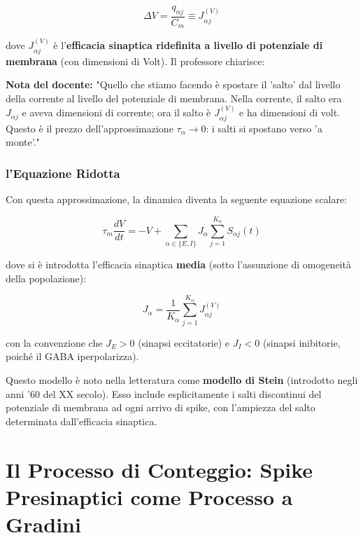 \begin{equation}
\Delta V = \frac{q_{\alpha j}}{C_m} \equiv J_{\alpha j}^{(V)}
\end{equation}

dove $J_{\alpha j}^{(V)}$ è l'\textbf{efficacia sinaptica ridefinita a livello di potenziale di membrana} (con dimensioni di Volt). Il professore chiarisce:

\begin{tcolorbox}[colback=gray!5, colframe=gray!40, arc=2mm, boxrule=0.5pt]
\textbf{Nota del docente:} "Quello che stiamo facendo è spostare il 'salto' dal livello della corrente al livello del potenziale di membrana. Nella corrente, il salto era $J_{\alpha j}$ e aveva dimensioni di corrente; ora il salto è $J_{\alpha j}^{(V)}$ e ha dimensioni di volt. Questo è il prezzo dell'approssimazione $\tau_\alpha \to 0$: i salti si spostano verso 'a monte'."
\end{tcolorbox}

\subsubsection{ l'Equazione Ridotta}

Con questa approssimazione, la dinamica diventa la seguente equazione scalare:

\begin{equation}
\tau_m \frac{dV}{dt} = -V + \sum_{\alpha \in \{E,I\}} J_\alpha \sum_{j=1}^{K_\alpha} S_{\alpha j}(t)
\end{equation}

dove si è introdotta l'efficacia sinaptica \textbf{media} (sotto l'assunzione di omogeneità della popolazione):

\begin{equation}
J_\alpha = \frac{1}{K_\alpha} \sum_{j=1}^{K_\alpha} J_{\alpha j}^{(V)}
\end{equation}

con la convenzione che $J_E > 0$ (sinapsi eccitatorie) e $J_I < 0$ (sinapsi inibitorie, poiché il GABA iperpolarizza).

Questo modello è noto nella letteratura come \textbf{modello di Stein} (introdotto negli anni '60 del XX secolo). Esso include esplicitamente i salti discontinui del potenziale di membrana ad ogni arrivo di spike, con l'ampiezza del salto determinata dall'efficacia sinaptica.

\section{Il Processo di Conteggio: Spike Presinaptici come Processo a Gradini}

